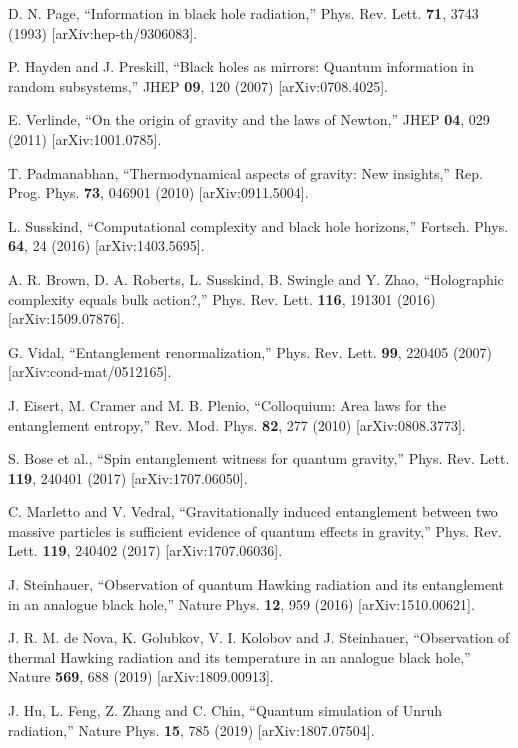 \documentclass[11pt,letterpaper]{article}
\begin{document}
\begin{thebibliography}{99}
D. N. Page, ``Information in black hole radiation,''
Phys. Rev. Lett. \textbf{71}, 3743 (1993) [arXiv:hep-th/9306083].

P. Hayden and J. Preskill, ``Black holes as mirrors: Quantum information in random subsystems,''
JHEP \textbf{09}, 120 (2007) [arXiv:0708.4025].

E. Verlinde, ``On the origin of gravity and the laws of Newton,''
JHEP \textbf{04}, 029 (2011) [arXiv:1001.0785].

T. Padmanabhan, ``Thermodynamical aspects of gravity: New insights,''
Rep. Prog. Phys. \textbf{73}, 046901 (2010) [arXiv:0911.5004].

L. Susskind, ``Computational complexity and black hole horizons,''
Fortsch. Phys. \textbf{64}, 24 (2016) [arXiv:1403.5695].

A. R. Brown, D. A. Roberts, L. Susskind, B. Swingle and Y. Zhao, ``Holographic complexity equals bulk action?,''
Phys. Rev. Lett. \textbf{116}, 191301 (2016) [arXiv:1509.07876].

G. Vidal, ``Entanglement renormalization,''
Phys. Rev. Lett. \textbf{99}, 220405 (2007) [arXiv:cond-mat/0512165].

J. Eisert, M. Cramer and M. B. Plenio, ``Colloquium: Area laws for the entanglement entropy,''
Rev. Mod. Phys. \textbf{82}, 277 (2010) [arXiv:0808.3773].

S. Bose et al., ``Spin entanglement witness for quantum gravity,''
Phys. Rev. Lett. \textbf{119}, 240401 (2017) [arXiv:1707.06050].

C. Marletto and V. Vedral, ``Gravitationally induced entanglement between two massive particles is sufficient evidence of quantum effects in gravity,''
Phys. Rev. Lett. \textbf{119}, 240402 (2017) [arXiv:1707.06036].

J. Steinhauer, ``Observation of quantum Hawking radiation and its entanglement in an analogue black hole,''
Nature Phys. \textbf{12}, 959 (2016) [arXiv:1510.00621].

J. R. M. de Nova, K. Golubkov, V. I. Kolobov and J. Steinhauer, ``Observation of thermal Hawking radiation and its temperature in an analogue black hole,''
Nature \textbf{569}, 688 (2019) [arXiv:1809.00913].

J. Hu, L. Feng, Z. Zhang and C. Chin, ``Quantum simulation of Unruh radiation,''
Nature Phys. \textbf{15}, 785 (2019) [arXiv:1807.07504].


\end{thebibliography}
\end{document}
